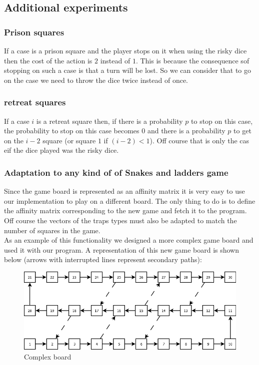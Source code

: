 \documentclass{eplDoc}
\begin{document}




\subsection{Additional experiments}


\subsubsection{Prison squares}

If a case is a prison square and the player stops on it when using the risky dice then the cost of the action is $2$ instead of $1$. This is because the consequence sof stopping on such a case is that a turn will be lost. So we can consider that to go on the case we need to throw the dice twice instead of once. 

\subsubsection{retreat squares}

If a case $i$ is a retreat square then, if there is a probability $p$ to stop on this case,  the probability to stop on this case becomes $0$ and there is a probability $p$ to get on the  $i-2$ square (or square $1$ if $(i-2)<1$). Off course that is only the cas eif the dice played was the risky dice. 


\subsubsection{Adaptation to any kind of of Snakes and ladders game}

Since the game board is represented as an affinity matrix it is very easy to use our implementation to play on a different board. The only thing to do is to define the affinity matrix corresponding to the new game and fetch it to the program. Off course the vectors of the traps types must also be adapted to match the number of squares in the game. \\ 
As an example of this functionality we designed a more complex game board and used it with our program. A representation of this new game board is shown below (arrows with interrupted lines represent secondary paths): 

\FloatBarrier
\begin{figure}%
	\includegraphics[width=\columnwidth]{newboard.png}%
	\caption{Complex board}%
	\label{newboard}%
\end{figure}
\FloatBarrier
 \ \\ 
\end{document}
